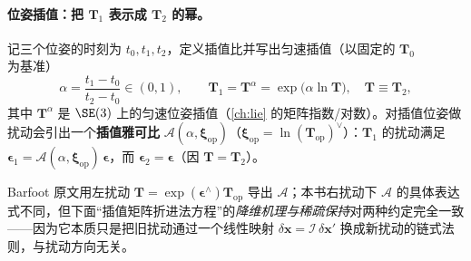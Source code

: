 \paragraph{位姿插值：把 $\mathbf{T}_1$ 表示成 $\mathbf{T}_2$ 的幂。}
记三个位姿的时刻为 $t_0,t_1,t_2$，定义插值比并写出匀速插值（以固定的 $\mathbf{T}_0$ 为基准）
\begin{equation}
\alpha=\frac{t_1-t_0}{t_2-t_0}\in(0,1),\qquad
\mathbf{T}_1=\mathbf{T}^{\alpha}=\exp\!\big(\alpha\ln\mathbf{T}\big),\quad \mathbf{T}\equiv\mathbf{T}_2,
\label{eq:sys-interp-alpha}
\end{equation}
其中 $\mathbf{T}^\alpha$ 是 $\SE(3)$ 上的匀速位姿插值（\cref{ch:lie} 的矩阵指数/对数）。对插值位姿做扰动会引出一个\textbf{插值雅可比} $\boldsymbol{\mathcal{A}}(\alpha,\boldsymbol\xi_{\mathrm{op}})$（$\boldsymbol\xi_{\mathrm{op}}=\ln(\mathbf{T}_{\mathrm{op}})^\vee$）：$\mathbf{T}_1$ 的扰动满足 $\boldsymbol\epsilon_1=\boldsymbol{\mathcal{A}}(\alpha,\boldsymbol\xi_{\mathrm{op}})\,\boldsymbol\epsilon$，而 $\boldsymbol\epsilon_2=\boldsymbol\epsilon$（因 $\mathbf{T}=\mathbf{T}_2$）。

\begin{note}
Barfoot 原文用左扰动 $\mathbf{T}=\exp(\boldsymbol\epsilon^\wedge)\mathbf{T}_{\mathrm{op}}$ 导出 $\boldsymbol{\mathcal{A}}$；本书右扰动下 $\boldsymbol{\mathcal{A}}$ 的具体表达式不同，但下面“插值矩阵折进法方程”的\emph{降维机理与稀疏保持}对两种约定完全一致——因为它本质只是把旧扰动通过一个线性映射 $\delta\mathbf{x}=\boldsymbol{\mathcal{I}}\,\delta\mathbf{x}'$ 换成新扰动的链式法则，与扰动方向无关。
\end{note}


